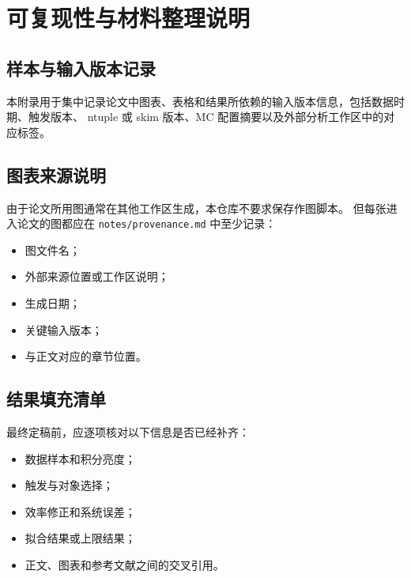 \chapter{可复现性与材料整理说明}

\section{样本与输入版本记录}

本附录用于集中记录论文中图表、表格和结果所依赖的输入版本信息，包括数据时期、触发版本、
ntuple 或 skim 版本、MC 配置摘要以及外部分析工作区中的对应标签。

\section{图表来源说明}

由于论文所用图通常在其他工作区生成，本仓库不要求保存作图脚本。
但每张进入论文的图都应在 \texttt{notes/provenance.md} 中至少记录：

\begin{itemize}
  \item 图文件名；
  \item 外部来源位置或工作区说明；
  \item 生成日期；
  \item 关键输入版本；
  \item 与正文对应的章节位置。
\end{itemize}

\section{结果填充清单}

最终定稿前，应逐项核对以下信息是否已经补齐：

\begin{itemize}
  \item 数据样本和积分亮度；
  \item 触发与对象选择；
  \item 效率修正和系统误差；
  \item 拟合结果或上限结果；
  \item 正文、图表和参考文献之间的交叉引用。
\end{itemize}
